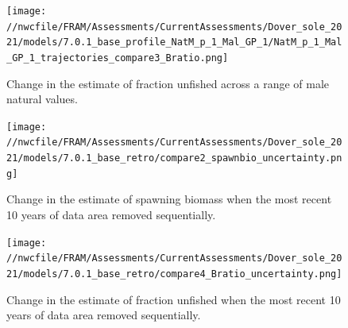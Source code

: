 \documentclass[11pt,
  english,
  a4paper,
]{article}
\begin{document}
\tagmcend\tagstructend


\begin{figure}
\centering
\texttt{[image: //nwcfile/FRAM/Assessments/CurrentAssessments/Dover\_sole\_2021/models/7.0.1\_base\_profile\_NatM\_p\_1\_Mal\_GP\_1/NatM\_p\_1\_Mal\_GP\_1\_trajectories\_compare3\_Bratio.png]}
\caption{Change in the estimate of fraction unfished across a range of male natural values.\label{fig:m-male-depl}}
\end{figure}

\tagmcend\tagstructend


\begin{figure}
\centering
\texttt{[image: //nwcfile/FRAM/Assessments/CurrentAssessments/Dover\_sole\_2021/models/7.0.1\_base\_retro/compare2\_spawnbio\_uncertainty.png]}
\caption{Change in the estimate of spawning biomass when the most recent 10 years of data area removed sequentially.\label{fig:retro-ssb}}
\end{figure}

\tagmcend\tagstructend


\begin{figure}
\centering
\texttt{[image: //nwcfile/FRAM/Assessments/CurrentAssessments/Dover\_sole\_2021/models/7.0.1\_base\_retro/compare4\_Bratio\_uncertainty.png]}
\caption{Change in the estimate of fraction unfished when the most recent 10 years of data area removed sequentially.\label{fig:retro-depl}}
\end{figure}

\tagmcend\tagstructend

\end{document}
